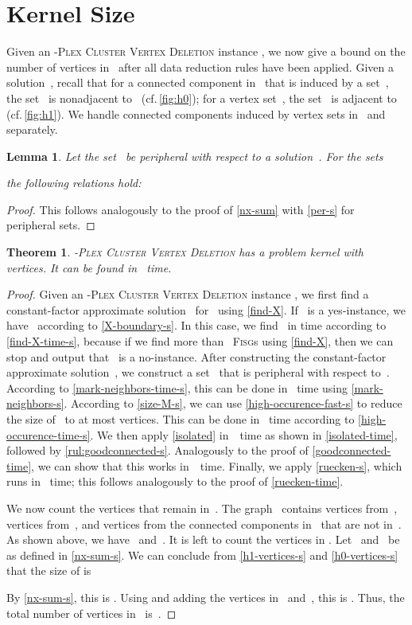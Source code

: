 \documentclass[12pt, a4paper, abstracton]{scrreprt}
\newcommand{\name}{\textsc}
\newcommand{\pvd}[1]{\name{\mbox{-Plex} Cluster Vertex Deletion}}
\newcommand{\FISG}{\textsc{Fisg}}
\newcounter{theorem}
\newtheorem{satz}{Theorem}[chapter]
\newtheorem{lemma}{Lemma}[chapter]
\theoremstyle{definition}
\theoremstyle{remark}
\begin{document}
\section{Kernel Size}
\label{result-s}
Given an \pvd s instance , we now give a bound on the number of vertices in~ after all data reduction rules have been applied. Given a solution~, recall that for a connected component in~ that is induced by a set~, the set~ is nonadjacent to~ (cf.\,\autoref{fig:h0}); for a vertex set~, the set~ is adjacent to~ (cf.\,\autoref{fig:h1}). We handle connected components induced by vertex sets in~ and~ separately.

\begin{lemma}\label{nx-sum-s}
Let the set~ be peripheral with respect to a solution~.
For the sets
  
  the following relations hold:
  
\end{lemma}
 
\begin{proof}
  This follows analogously to the proof of \autoref{nx-sum} with \autoref{per-s} for peripheral sets.
\end{proof}

\begin{satz}
  \pvd s has a problem kernel with~ vertices. It can be found in ~time.
\end{satz}

\begin{proof}
  Given an \pvd s instance , we first find a constant-factor approximate solution~ for~ using \autoref{find-X}. If~ is a yes-instance, we have~ according to \autoref{X-boundary-s}. In this case, we find~ in  time according to \autoref{find-X-time-s}, because if we find more than~ \FISG{}s using \autoref{find-X}, then we can stop and output that~ is a no-instance. After constructing the constant-factor approximate solution~, we construct a set~ that is peripheral with respect to~. According to \autoref{mark-neighbors-time-s}, this can be done in~ time using \autoref{mark-neighbors-s}. According to \autoref{size-M-s}, we can use \autoref{high-occurence-fast-s} to reduce the size of~ to at most  vertices. This can be done in~ time according to \autoref{high-occurence-time-s}. We then apply \autoref{isolated} in~~time as shown in \autoref{isolated-time}, followed by \autoref{rul:goodconnected-s}. Analogously to the proof of \autoref{goodconnected-time}, we can show that this works in~~time.  Finally, we apply \autoref{ruecken-s}, which runs in~ time; this follows analogously to the proof of \autoref{ruecken-time}.

  We now count the vertices that remain in~. The graph~ contains vertices from~, vertices from~, and vertices from the connected components in~ that are not in~. As shown above, we have~ and~. It is left to count the vertices in . Let~ and~ be as defined in \autoref{nx-sum-s}. We can conclude from \autoref{h1-vertices-s} and \autoref{h0-vertices-s} that the size of  is
  
By \autoref{nx-sum-s}, this is . Using  and adding the vertices in~ and~, this is . Thus, the total number of vertices in~ is~.
\end{proof}
\end{document}
